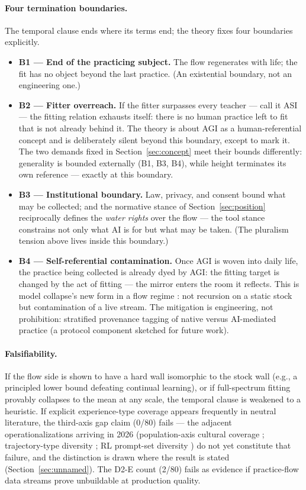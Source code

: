 \documentclass[10pt]{article}
\begin{document}
\paragraph{Four termination boundaries.}
The temporal clause ends where its terms end; the theory fixes four boundaries explicitly.
\begin{itemize}
\item \textbf{B1 --- End of the practicing subject.} The flow regenerates with life; the fit has no object beyond the last practice. (An existential boundary, not an engineering one.)
\item \textbf{B2 --- Fitter overreach.} If the fitter surpasses every teacher --- call it ASI --- the fitting relation exhausts itself: there is no human practice left to fit that is not already behind it. The theory is about AGI as a human-referential concept and is deliberately silent beyond this boundary, except to mark it. The two demands fixed in Section~\ref{sec:concept} meet their bounds differently: generality is bounded externally (B1, B3, B4), while height terminates its own reference --- exactly at this boundary.
\item \textbf{B3 --- Institutional boundary.} Law, privacy, and consent bound what may be collected; and the normative stance of Section~\ref{sec:position} reciprocally defines the \emph{water rights} over the flow --- the tool stance constrains not only what AI is for but what may be taken. (The pluralism tension above lives inside this boundary.)
\item \textbf{B4 --- Self-referential contamination.} Once AGI is woven into daily life, the practice being collected is already dyed by AGI: the fitting target is changed by the act of fitting --- the mirror enters the room it reflects. This is model collapse's new form in a flow regime \cite{shumailov2024collapse}: not recursion on a static stock but contamination of a live stream. The mitigation is engineering, not prohibition: stratified provenance tagging of native versus AI-mediated practice (a protocol component sketched for future work).
\end{itemize}

\paragraph{Falsifiability.}
If the flow side is shown to have a hard wall isomorphic to the stock wall (e.g., a principled lower bound defeating continual learning), or if full-spectrum fitting provably collapses to the mean at any scale, the temporal clause is weakened to a heuristic. If explicit experience-type coverage appears frequently in neutral literature, the third-axis gap claim (0/80) fails --- the adjacent operationalizations arriving in 2026 (population-axis cultural coverage \cite{sahu2026culturefunnel}; trajectory-type diversity \cite{fu2026tjpo}; RL prompt-set diversity \cite{jin2025entropy}) do not yet constitute that failure, and the distinction is drawn where the result is stated (Section~\ref{sec:unnamed}). The D2-E count (2/80) fails as evidence if practice-flow data streams prove unbuildable at production quality.
\end{document}
